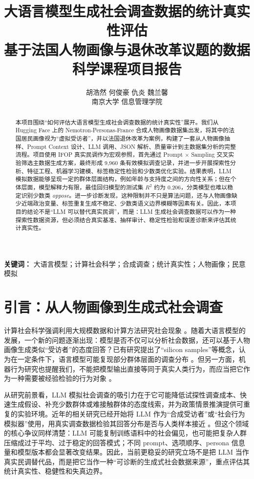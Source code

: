 \documentclass[11pt,a4paper]{ctexart}
\title{\textbf{大语言模型生成社会调查数据的统计真实性评估}\\
\large 基于法国人物画像与退休改革议题的数据科学课程项目报告}
\author{胡浩然 \quad 何俊豪 \quad 仇炎 \quad 魏兰馨\\
南京大学 信息管理学院}
\date{}
\newcommand{\dataset}{Nemotron-Personas-France}
\newcommand{\ifop}{IFOP}
\begin{document}
\maketitle

\begin{abstract}
本项目围绕“如何评估大语言模型生成社会调查数据的统计真实性”展开。我们从 Hugging Face 上的 \dataset{} 合成人物画像数据集出发，将其中的法国居民画像视为“虚拟受访者”，并以法国退休改革为案例，构建了一套从人物画像抽样、Prompt Context 设计、LLM 调用、JSON 解析、质量审计到主数据集分析的完整流程。项目使用 \ifop{} 真实民调作为宏观参照，首先通过 Prompt $\times$ Sampling 交叉实验筛选主数据生成方案，最终形成 9,960 条有效模拟调查记录，并进一步开展探索性分析、特征工程、机器学习建模、标签稳定性检验和少数类优化实验。结果表明，LLM 模拟数据能够呈现一定的群体层面结构，例如年龄与支持度之间的方向性关系；但在个体层面，模型解释力有限，最佳回归模型的测试集 $R^2$ 约为 0.206，分类模型也难以稳定识别少数类 \textit{oppose}。进一步诊断发现，这种限制并不只是算法问题，还与人物画像缺少近端政治变量、标签重复生成不稳定、少数类语义边界模糊等因素有关。因此，本项目的结论不是“LLM 可以替代真实民调”，而是：LLM 生成社会调查数据可以作为一种探索性数据资源，但必须结合真实基准、抽样审计、稳定性检验和误差诊断来评估其统计真实性。
\end{abstract}

\begin{center}
\textbf{关键词：} 大语言模型；计算社会科学；合成调查；统计真实性；人物画像；民意模拟
\end{center}

\section{引言：从人物画像到生成式社会调查}
计算社会科学强调利用大规模数据和计算方法研究社会现象 \cite{lazer2009computational}。随着大语言模型的发展，一个新的问题逐渐出现：模型是否不仅可以分析社会数据，还可以基于人物画像生成类似“受访者”的态度回答？已有研究提出了“silicon samples”等概念，认为在一定条件下，语言模型可能复现部分群体层面的调查分布 \cite{argyle2023out,aher2023using}。但另一方面，机器行为研究也提醒我们，不能把模型输出直接等同于真实人类行为，而应当把它作为一种需要被经验检验的行为对象 \cite{rahwan2019machine}。

从研究前景看，LLM 模拟社会调查的吸引力在于它可能降低试探性调查成本、快速生成假设、补充少数群体或难接触群体的态度线索，并为政策情景推演提供可重复的实验环境。近年的相关研究已经开始将 LLM 作为“合成受访者”或“社会行为模拟器”使用，用真实调查数据检验其回答分布是否与人类样本接近 \cite{argyle2023out,geng2024chameleons}。但这个领域的核心争议同样清楚：LLM 可能复制训练语料中的社会偏见，也可能把复杂人群压缩成过于平均、过于稳定的回答模式；不同 prompt、选项顺序、persona 信息量和模型版本都会显著改变结果。因此，当前更稳妥的研究立场不是把 LLM 当作真实民调替代品，而是把它当作一种“可诊断的生成式社会数据来源”，重点评估其统计真实性、稳健性和失真边界。
\end{document}
